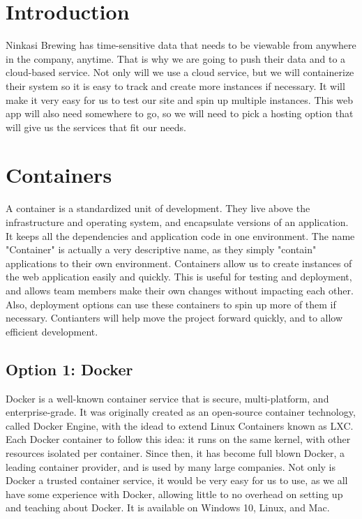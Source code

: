 \section{Introduction}
    
    Ninkasi Brewing has time-sensitive data that needs to be viewable from anywhere in the company, anytime. That is why we are going to push their data and to a cloud-based service.
    Not only will we use a cloud service, but we will containerize their system so it is easy to track and create more instances if necessary. It will make it very easy for us to test our site and spin up multiple instances.  
    This web app will also need somewhere to go, so we will need to pick a hosting option that will give us the services that fit our needs. 
    
\section{Containers}
    A container is a standardized unit of development. They live above the infrastructure and operating system, and encapsulate versions of an application. 
    It keeps all the dependencies and application code in one environment. The name "Container" is actually a very descriptive name, as they simply "contain" applications to their own environment. 
    Containers allow us to create instances of the web application easily and quickly. 
    This is useful for testing and deployment, and allows team members make their own changes without impacting each other. 
    Also, deployment options can use these containers to spin up more of them if necessary. 
    Contianters will help move the project forward quickly, and to allow efficient development.
    
    \subsection{Option 1: Docker}
        Docker is a well-known container service that is secure, multi-platform, and enterprise-grade. It was originally created as an open-source container technology, called Docker Engine, with the idead to extend Linux Containers known as LXC.\cite{DockerEng} Each Docker container to follow this idea: it runs on the same kernel, with other resources isolated per container.
        Since then, it has become full blown Docker, a leading container provider, and is used by many large companies. \cite{DockerCust} Not only is Docker a trusted container service, it would be very easy for us to use, as we all have some experience with Docker, allowing little to no overhead on setting up and teaching about Docker. It is available on Windows 10, Linux, and Mac. 
        
